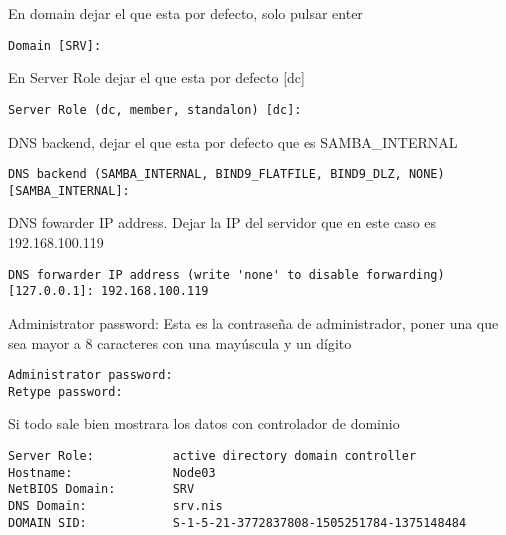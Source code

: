 \documentclass[../main.tex]{subfiles}
\begin{document}
\begin{enumerate}
        En domain dejar el que esta por defecto, solo pulsar enter
        \begin{listing}[H]
\begin{verbatim}
Domain [SRV]:
\end{verbatim}
\end{listing}

        En Server Role dejar el que esta por defecto [dc]
        \begin{listing}[H]
\begin{verbatim}
Server Role (dc, member, standalon) [dc]:
\end{verbatim}
\end{listing}

        DNS backend, dejar el que esta por defecto que es SAMBA\_INTERNAL
        \begin{listing}[H]
\begin{verbatim}
DNS backend (SAMBA_INTERNAL, BIND9_FLATFILE, BIND9_DLZ, NONE) [SAMBA_INTERNAL]:
\end{verbatim}
\end{listing}

        DNS fowarder IP address. Dejar la IP del servidor que en este caso es 192.168.100.119
        \begin{listing}[H]
\begin{verbatim}
DNS forwarder IP address (write 'none' to disable forwarding) [127.0.0.1]: 192.168.100.119
\end{verbatim}
\end{listing}

        Administrator password: Esta es la contraseña de administrador, poner una que sea mayor a 8 caracteres con una mayúscula y un dígito
        \begin{listing}[H]
\begin{verbatim}
Administrator password:
Retype password:
\end{verbatim}
\end{listing}

        Si todo sale bien mostrara los datos con controlador de dominio
        \begin{listing}[H]
\begin{verbatim}
Server Role:           active directory domain controller
Hostname:              Node03
NetBIOS Domain:        SRV
DNS Domain:            srv.nis
DOMAIN SID:            S-1-5-21-3772837808-1505251784-1375148484
\end{verbatim}
\end{listing}


\end{enumerate}
\end{document}

